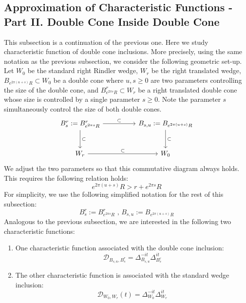 \documentclass[a4paper,11pt]{article}
\theoremstyle{definition}
\theoremstyle{remark}
\begin{document}
\subsection{Approximation of Characteristic Functions - Part II. Double Cone Inside Double Cone}\label{subsection:coneinsidecone}
This subsection is a continuation of the previous one. Here we study characteristic function of double cone inclusions. More precisely, using the same notation as the previous subsection, we consider the following geometric set-up. Let $W_0$ be the standard right Rindler wedge, $W_r$ be the right translated wedge, $B_{e^{2\pi(u+s)}R}\subset W_0$ be a double cone where $u, s \geq 0$ are two parameters controlling the size of the double cone, and $B^r_{e^{2\pi s}R}\subset W_r$ be a right translated double cone whose size is controlled by a single parameter $s\geq 0$. Note the parameter $s$ simultaneously control the size of both double cones.
\begin{equation}
    \begin{tikzcd}[column sep=huge, row sep=large]
        B^r_s:=B^r_{e^{2\pi s}R} \arrow[r, "\subset"] \arrow[ d, "\subset"] & B_{s,u}:=B_{e^{2\pi(u+s)}R} \arrow[d, "\subset"] 
        \\
        W_r \arrow[r, "\subset"]                 & W_0
    \end{tikzcd}    
\end{equation}
We adjust the two parameters so that this commutative diagram always holds. This requires the following relation holds:
\begin{equation}
    e^{2\pi(u + s)}R > r + e^{2\pi s}R
\end{equation}
For simplicity, we use the following simplified notation for the rest of this subsection:
\begin{equation}
    B^r_s:=B^r_{e^{2\pi s}R}\text{ , }B_{s,u}:=B_{e^{2\pi (u + s)}R}
\end{equation}
Analogous to the previous subsection, we are interested in the following two characteristic functions:
\begin{enumerate}
    \item One characteristic function associated with the double cone inclusion:
    \begin{equation}
        \mathcal{D}_{B_{s,u}, B^r_s} = \Delta_{B_{s,u}}^{-it}\Delta_{B^r_s}^{it}
    \end{equation}
    \item The other characteristic function is associated with the standard wedge inclusion:
    \begin{equation}
        \mathcal{D}_{W_0,W_r}(t) = \Delta_{W_0}^{-it}\Delta_{W_r}^{it}
    \end{equation}
\end{enumerate}
\end{document}

